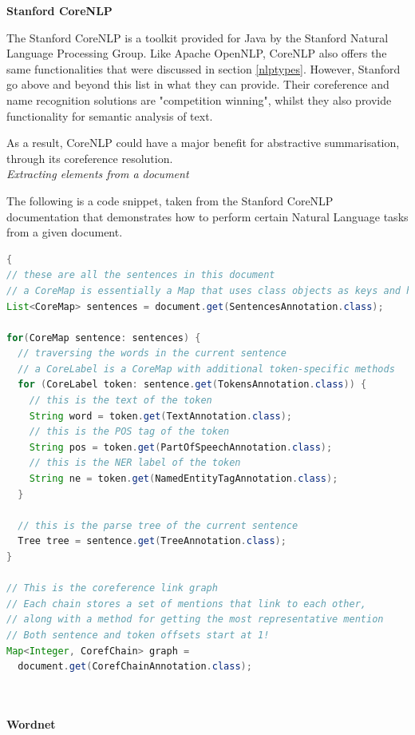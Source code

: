 \documentclass[12pt]{article}
\begin{document}
\textbf{Stanford CoreNLP}

The Stanford CoreNLP is a toolkit provided for Java by the Stanford Natural Language Processing Group. Like Apache OpenNLP, CoreNLP also offers the same functionalities that were discussed in section \ref{nlptypes}. However, Stanford go above and beyond this list in what they can provide. Their coreference and name recognition solutions are "competition winning", whilst they also provide functionality for semantic analysis of text.

As a result, CoreNLP could have a major benefit for abstractive summarisation, through its coreference resolution. \\

\emph{Extracting elements from a document}

The following is a code snippet, taken from the Stanford CoreNLP documentation that demonstrates how to perform certain Natural Language tasks from a given document. \\

\begin{lstlisting}[language=Java, firstnumber=1]
{
// these are all the sentences in this document
// a CoreMap is essentially a Map that uses class objects as keys and has values with custom types
List<CoreMap> sentences = document.get(SentencesAnnotation.class);

for(CoreMap sentence: sentences) {
  // traversing the words in the current sentence
  // a CoreLabel is a CoreMap with additional token-specific methods
  for (CoreLabel token: sentence.get(TokensAnnotation.class)) {
    // this is the text of the token
    String word = token.get(TextAnnotation.class);
    // this is the POS tag of the token
    String pos = token.get(PartOfSpeechAnnotation.class);
    // this is the NER label of the token
    String ne = token.get(NamedEntityTagAnnotation.class);
  }

  // this is the parse tree of the current sentence
  Tree tree = sentence.get(TreeAnnotation.class);
}

// This is the coreference link graph
// Each chain stores a set of mentions that link to each other,
// along with a method for getting the most representative mention
// Both sentence and token offsets start at 1!
Map<Integer, CorefChain> graph = 
  document.get(CorefChainAnnotation.class); 
 
\end{lstlisting}

\textbf{\\ Wordnet}
\end{document}
